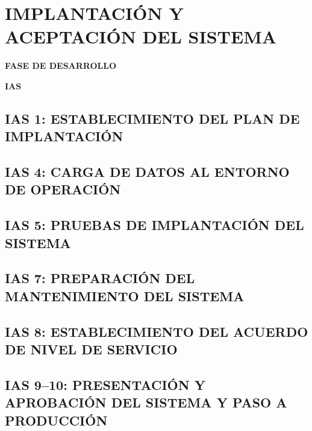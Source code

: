 \newpage
\chapter{IMPLANTACIÓN Y ACEPTACIÓN DEL SISTEMA}
	\vspace{2cm}	
	\begin{center}
	{\Large \textbf{FASE DE DESARROLLO} \par}
	\end{center}
	\vspace{5cm}
	
	\begin{center}
	\Huge \textbf{IAS}\par
	\end{center}

\newpage

\section{IAS 1: ESTABLECIMIENTO DEL PLAN DE IMPLANTACIÓN}


\newpage
\section{IAS 4: CARGA DE DATOS AL ENTORNO DE OPERACIÓN}


\newpage
\section{IAS 5: PRUEBAS DE IMPLANTACIÓN DEL SISTEMA}


\newpage
\section{IAS 7: PREPARACIÓN DEL MANTENIMIENTO DEL SISTEMA}


\newpage
\section{IAS 8: ESTABLECIMIENTO DEL ACUERDO DE NIVEL DE SERVICIO}


\newpage
\section{IAS 9--10: PRESENTACIÓN Y APROBACIÓN DEL SISTEMA Y PASO A PRODUCCIÓN}


